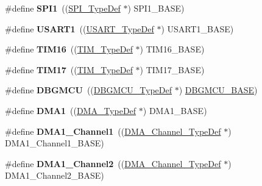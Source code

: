 \begin{DoxyCompactItemize}
\#define {\bfseries S\+P\+I1}~((\hyperlink{struct_s_p_i___type_def}{S\+P\+I\+\_\+\+Type\+Def} $\ast$) S\+P\+I1\+\_\+\+B\+A\+SE)
\item 
\mbox{\label{group___peripheral__declaration_ga92871691058ff7ccffd7635930cb08da}} 
\#define {\bfseries U\+S\+A\+R\+T1}~((\hyperlink{struct_u_s_a_r_t___type_def}{U\+S\+A\+R\+T\+\_\+\+Type\+Def} $\ast$) U\+S\+A\+R\+T1\+\_\+\+B\+A\+SE)
\item 
\mbox{\label{group___peripheral__declaration_ga73ec606e7dacf17e18c661e8ff8c7c8d}} 
\#define {\bfseries T\+I\+M16}~((\hyperlink{struct_t_i_m___type_def}{T\+I\+M\+\_\+\+Type\+Def} $\ast$) T\+I\+M16\+\_\+\+B\+A\+SE)
\item 
\mbox{\label{group___peripheral__declaration_ga65aea6c8b36439e44ad6cde0e6891aab}} 
\#define {\bfseries T\+I\+M17}~((\hyperlink{struct_t_i_m___type_def}{T\+I\+M\+\_\+\+Type\+Def} $\ast$) T\+I\+M17\+\_\+\+B\+A\+SE)
\item 
\mbox{\label{group___peripheral__declaration_ga92ec6d9ec2251fda7d4ce09748cd74b4}} 
\#define {\bfseries D\+B\+G\+M\+CU}~((\hyperlink{struct_d_b_g_m_c_u___type_def}{D\+B\+G\+M\+C\+U\+\_\+\+Type\+Def} $\ast$) \hyperlink{group___peripheral__memory__map_ga4adaf4fd82ccc3a538f1f27a70cdbbef}{D\+B\+G\+M\+C\+U\+\_\+\+B\+A\+SE})
\item 
\mbox{\label{group___peripheral__declaration_gacc16d2a5937f7585320a98f7f6b578f9}} 
\#define {\bfseries D\+M\+A1}~((\hyperlink{struct_d_m_a___type_def}{D\+M\+A\+\_\+\+Type\+Def} $\ast$) D\+M\+A1\+\_\+\+B\+A\+SE)
\item 
\mbox{\label{group___peripheral__declaration_gac83c5be824be1c02716e2522e80ddf7a}} 
\#define {\bfseries D\+M\+A1\+\_\+\+Channel1}~((\hyperlink{struct_d_m_a___channel___type_def}{D\+M\+A\+\_\+\+Channel\+\_\+\+Type\+Def} $\ast$) D\+M\+A1\+\_\+\+Channel1\+\_\+\+B\+A\+SE)
\item 
\mbox{\label{group___peripheral__declaration_ga23d7631dd10c645e06971b2543ba2949}} 
\#define {\bfseries D\+M\+A1\+\_\+\+Channel2}~((\hyperlink{struct_d_m_a___channel___type_def}{D\+M\+A\+\_\+\+Channel\+\_\+\+Type\+Def} $\ast$) D\+M\+A1\+\_\+\+Channel2\+\_\+\+B\+A\+SE)

\end{DoxyCompactItemize}
